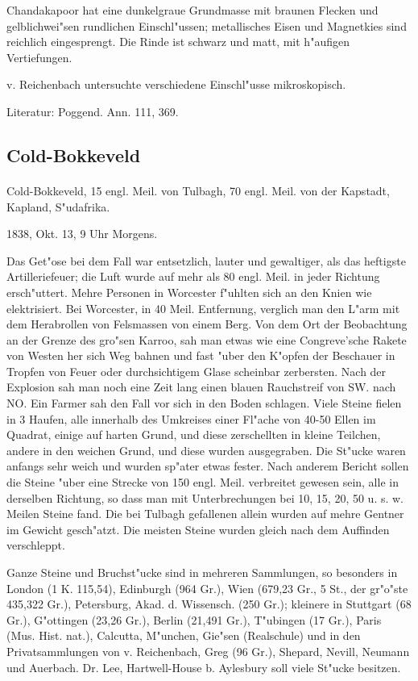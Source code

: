\documentclass[a4paper, 11pt, oneside]{article}
\begin{document}
Chandakapoor hat eine dunkelgraue Grundmasse mit braunen Flecken und gelblichwei"sen rundlichen Einschl"ussen; metallisches Eisen und Magnetkies sind reichlich eingesprengt. Die Rinde ist schwarz und matt, mit h"aufigen Vertiefungen.

v. Reichenbach untersuchte verschiedene Einschl"usse mikroskopisch.

\footnotesize
Literatur: Poggend. Ann. 111, 369.

\subsection{Cold-Bokkeveld}
\normalsize
\paragraph{}
Cold-Bokkeveld, 15 engl. Meil. von Tulbagh, 70 engl. Meil. von der Kapstadt, Kapland, S"udafrika.

1838, Okt. 13, 9 Uhr Morgens.

Das Get"ose bei dem Fall war entsetzlich, lauter und gewaltiger, als das heftigste Artilleriefeuer; die Luft wurde auf mehr als 80 engl. Meil. in jeder Richtung ersch"uttert. Mehre Personen in Worcester f"uhlten sich an den Knien wie elektrisiert. Bei Worcester, in 40 Meil. Entfernung, verglich man den L"arm mit dem Herabrollen von Felsmassen von einem Berg. Von dem Ort der Beobachtung an der Grenze des gro"sen Karroo, sah man etwas wie eine Congreve'sche Rakete von Westen her sich Weg bahnen und fast "uber den K"opfen der Beschauer in Tropfen von Feuer oder durchsichtigem Glase scheinbar zerbersten. Nach der Explosion sah man noch eine Zeit lang einen blauen Rauchstreif von SW. nach NO. Ein Farmer sah den Fall vor sich in den Boden schlagen. Viele Steine fielen in 3 Haufen, alle innerhalb des Umkreises einer Fl"ache von 40-50 Ellen im Quadrat, einige auf harten Grund, und diese zerschellten in kleine Teilchen, andere in den weichen Grund, und diese wurden ausgegraben. Die St"ucke waren anfangs sehr weich und wurden sp"ater etwas fester. Nach anderem Bericht sollen die Steine "uber eine Strecke von 150 engl. Meil. verbreitet gewesen sein, alle in derselben Richtung, so dass man mit Unterbrechungen bei 10, 15, 20, 50 u. s. w. Meilen Steine fand. Die bei Tulbagh gefallenen allein wurden auf mehre Gentner im Gewicht gesch"atzt. Die meisten Steine wurden gleich nach dem Auffinden verschleppt.

Ganze Steine und Bruchst"ucke sind in mehreren Sammlungen, so besonders in London (1 K. 115,54), Edinburgh (964 Gr.), Wien (679,23 Gr., 5 St., der gr"o"ste 435,322 Gr.), Petersburg, Akad. d. Wissensch. (250 Gr.); kleinere in Stuttgart (68 Gr.), G"ottingen (23,26 Gr.), Berlin (21,491 Gr.), T"ubingen (17 Gr.), Paris (Mus. Hist. nat.), Calcutta, M"unchen, Gie"sen (Realschule) und in den Privatsammlungen von v. Reichenbach, Greg (96 Gr.), Shepard, Nevill, Neumann und Auerbach. Dr. Lee, Hartwell-House b. Aylesbury soll viele St"ucke besitzen.
\end{document}

